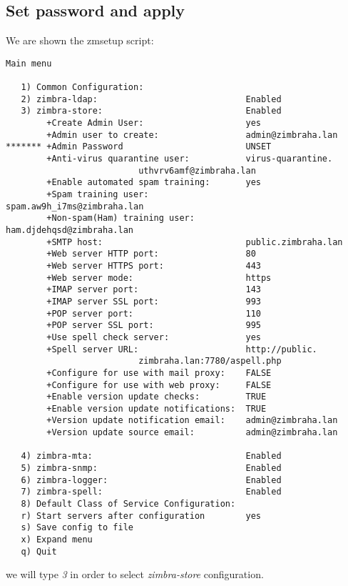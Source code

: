 \subsection {Set password and apply}
We are shown the zmsetup script:
\begin{verbatim}
Main menu

   1) Common Configuration:                                                  
   2) zimbra-ldap:                             Enabled                       
   3) zimbra-store:                            Enabled                       
        +Create Admin User:                    yes                           
        +Admin user to create:                 admin@zimbraha.lan            
******* +Admin Password                        UNSET                         
        +Anti-virus quarantine user:           virus-quarantine.
						  uthvrv6amf@zimbraha.lan
        +Enable automated spam training:       yes                           
        +Spam training user:                   spam.aw9h_i7ms@zimbraha.lan   
        +Non-spam(Ham) training user:          ham.djdehqsd@zimbraha.lan     
        +SMTP host:                            public.zimbraha.lan           
        +Web server HTTP port:                 80                            
        +Web server HTTPS port:                443                           
        +Web server mode:                      https                         
        +IMAP server port:                     143                           
        +IMAP server SSL port:                 993                           
        +POP server port:                      110                           
        +POP server SSL port:                  995                           
        +Use spell check server:               yes                           
        +Spell server URL:                     http://public.
						  zimbraha.lan:7780/aspell.php
        +Configure for use with mail proxy:    FALSE                         
        +Configure for use with web proxy:     FALSE                         
        +Enable version update checks:         TRUE                          
        +Enable version update notifications:  TRUE                          
        +Version update notification email:    admin@zimbraha.lan            
        +Version update source email:          admin@zimbraha.lan            

   4) zimbra-mta:                              Enabled                       
   5) zimbra-snmp:                             Enabled                       
   6) zimbra-logger:                           Enabled                       
   7) zimbra-spell:                            Enabled                       
   8) Default Class of Service Configuration:                                
   r) Start servers after configuration        yes                           
   s) Save config to file                                                    
   x) Expand menu                                                            
   q) Quit
\end{verbatim}
we will type \textit{3} in order to select \textit {zimbra-store} configuration.

